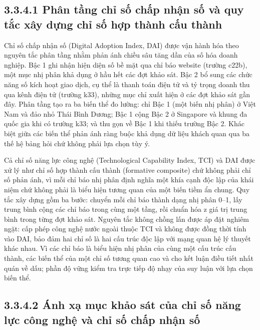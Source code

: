\documentclass[
  a4paper,
  13pt]{extreport}
\begin{document}
\hypertarget{phuxe2n-tux1ea7ng-chux1ec9-sux1ed1-chux1ea5p-nhux1eadn-sux1ed1-vuxe0-quy-tux1eafc-xuxe2y-dux1ef1ng-chux1ec9-sux1ed1-hux1ee3p-thuxe0nh-cux1ea5u-thuxe0nh}{%
\subsection{3.3.4.1 Phân tầng chỉ số chấp nhận số và quy tắc xây dựng
chỉ số hợp thành cấu
thành}\label{phuxe2n-tux1ea7ng-chux1ec9-sux1ed1-chux1ea5p-nhux1eadn-sux1ed1-vuxe0-quy-tux1eafc-xuxe2y-dux1ef1ng-chux1ec9-sux1ed1-hux1ee3p-thuxe0nh-cux1ea5u-thuxe0nh}}

Chỉ số chấp nhận số (Digital Adoption Index, DAI) được vận hành hóa theo
nguyên tắc phân tầng nhằm phản ánh chiều sâu tăng dần của số hóa doanh
nghiệp. Bậc 1 ghi nhận hiện diện số bề mặt qua chỉ báo website (trường
c22b), một mục nhị phân khả dụng ở hầu hết các đợt khảo sát. Bậc 2 bổ
sung các chức năng số kích hoạt giao dịch, cụ thể là thanh toán điện tử
và tỷ trọng doanh thu qua kênh điện tử (trường k33), những mục chỉ xuất
hiện ở các đợt khảo sát gần đây. Phân tầng tạo ra ba biến thể đo lường:
chỉ Bậc 1 (một biến nhị phân) ở Việt Nam và đảo nhỏ Thái Bình Dương; Bậc
1 cộng Bậc 2 ở Singapore và khung đa quốc gia khi có trường k33; và thu
gọn về Bậc 1 khi thiếu trường Bậc 2. Khác biệt giữa các biến thể phản
ánh ràng buộc khả dụng dữ liệu khách quan qua ba thế hệ bảng hỏi chứ
không phải lựa chọn tùy ý.

Cả chỉ số năng lực công nghệ (Technological Capability Index, TCI) và
DAI được xử lý như chỉ số hợp thành cấu thành (formative composite) chứ
không phải chỉ số phản ánh, vì mỗi chỉ báo nhị phân định nghĩa một khía
cạnh độc lập của khái niệm chứ không phải là biểu hiện tương quan của
một biến tiềm ẩn chung. Quy tắc xây dựng gồm ba bước: chuyển mỗi chỉ báo
thành dạng nhị phân 0--1, lấy trung bình cộng các chỉ báo trong cùng một
tầng, rồi chuẩn hóa z giá trị trung bình trong từng đợt khảo sát. Nguyên
tắc không chồng lấn được áp đặt nghiêm ngặt: cấp phép công nghệ nước
ngoài thuộc TCI và không được đồng thời tính vào DAI, bảo đảm hai chỉ số
là hai cấu trúc độc lập với mạng quan hệ lý thuyết khác nhau. Vì các chỉ
báo là biểu hiện nhị phân của cùng một cấu trúc cấu thành, các biến thể
của một chỉ số tương quan cao và cho kết luận điều tiết nhất quán về
dấu; phần độ vững kiểm tra trực tiếp độ nhạy của suy luận với lựa chọn
biến thể.

\hypertarget{uxe1nh-xux1ea1-mux1ee5c-khux1ea3o-suxe1t-cux1ee7a-chux1ec9-sux1ed1-nux103ng-lux1ef1c-cuxf4ng-nghux1ec7-vuxe0-chux1ec9-sux1ed1-chux1ea5p-nhux1eadn-sux1ed1}{%
\subsection{3.3.4.2 Ánh xạ mục khảo sát của chỉ số năng lực công nghệ và
chỉ số chấp nhận
số}\label{uxe1nh-xux1ea1-mux1ee5c-khux1ea3o-suxe1t-cux1ee7a-chux1ec9-sux1ed1-nux103ng-lux1ef1c-cuxf4ng-nghux1ec7-vuxe0-chux1ec9-sux1ed1-chux1ea5p-nhux1eadn-sux1ed1}}
\end{document}
